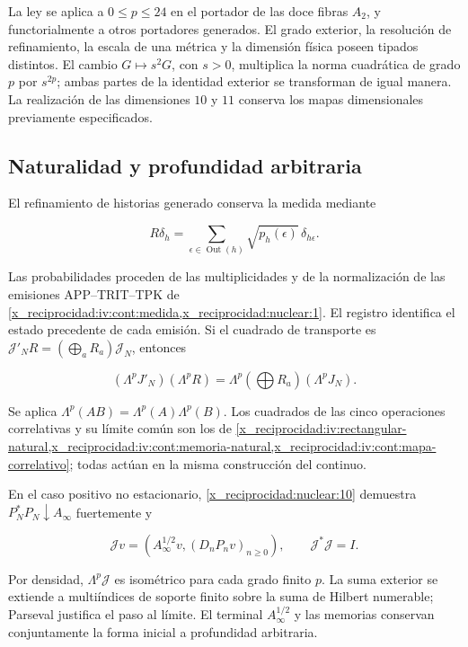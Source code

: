 La ley se aplica a \(0\le p\le24\) en el portador de las doce
fibras \(A_2\), y functorialmente a otros portadores generados.
El grado exterior, la resolución de refinamiento, la escala de
una métrica y la dimensión física poseen tipados distintos.
El cambio \(G\mapsto s^2G\), con \(s>0\), multiplica la norma
cuadrática de grado \(p\) por \(s^{2p}\); ambas partes de la
identidad exterior se transforman de igual manera.
La realización de las dimensiones \(10\) y \(11\) conserva los
mapas dimensionales previamente especificados.

\subsection{Naturalidad y profundidad arbitraria}

El refinamiento de historias generado conserva la medida mediante



\[
R\delta_h=\sum_{\epsilon\in\operatorname{Out}(h)}
\sqrt{p_h(\epsilon)}\,\delta_{h\epsilon}.
\]



Las probabilidades proceden de las multiplicidades y de la
normalización de las emisiones APP--TRIT--TPK de
\cref{x_reciprocidad:iv:cont:medida,x_reciprocidad:nuclear:1}.
El registro identifica el estado precedente de cada emisión.
Si el cuadrado de transporte es
\(\mathcal J'_NR=(\bigoplus_aR_a)\mathcal J_N\), entonces



\begin{equation}
(\Lambda^pJ'_N)(\Lambda^pR)
=\Lambda^p(\bigoplus R_a)(\Lambda^pJ_N).
\label{x_reciprocidad:nuc11:eq:23}
\end{equation}



Se aplica
\(\Lambda^p(AB)=\Lambda^p(A)\Lambda^p(B)\).
Los cuadrados de las cinco operaciones correlativas y su límite
común son los de
\cref{x_reciprocidad:iv:rectangular-natural,x_reciprocidad:iv:cont:memoria-natural,x_reciprocidad:iv:cont:mapa-correlativo}; todas actúan en la misma construcción
del continuo.

En el caso positivo no estacionario,
\cref{x_reciprocidad:nuclear:10} demuestra
\(P_N^*P_N\downarrow A_\infty\) fuertemente y



\[
\mathcal Jv=(A_\infty^{1/2}v,(D_nP_nv)_{n\ge0}),
\qquad \mathcal J^*\mathcal J=I.
\]



Por densidad, \(\Lambda^p\mathcal J\) es isométrico para cada
grado finito \(p\).
La suma exterior se extiende a multiíndices de soporte finito
sobre la suma de Hilbert numerable; Parseval justifica el paso
al límite.
El terminal \(A_\infty^{1/2}\) y las memorias conservan
conjuntamente la forma inicial a profundidad arbitraria.

